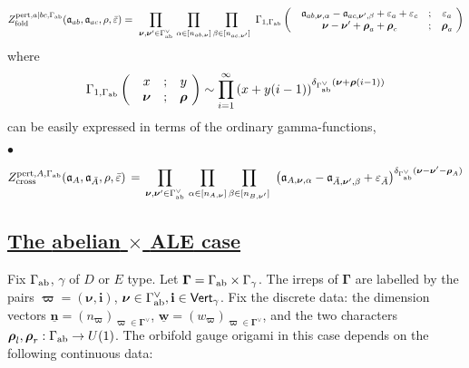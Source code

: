 \documentclass[12pt]{amsart}
\newcommand {\3}{\underline{\bf 3}}
\newcommand {\4}{\underline{\bf 4}}
\newcommand {\6}{\underline{\bf 6}}
\newcommand{\beq}{\begin{equation}}
\newcommand{\eeq}{\end{equation}}
\newcommand {\ib} {\mathbf{i}}
\newcommand {\bn}{\underline{\mathbf{n}}}
\newcommand {\bw} {\underline{\mathbf{w}}}
\newcommand {\bnu} {{\boldsymbol{\nu}}}
\newcommand {\bro} {{\boldsymbol{\rho}}}
\newcommand {\bom} {{\boldsymbol{\varpi}}}
\newcommand {\ac} {\mathfrak{a}}
\newcommand{\ve}{\varepsilon}
\newcommand{\Gammadi}{\boldsymbol{\Gamma}}
\newcommand{\Gamab}{{\Gamma}_{\rm ab}}
\newcommand{\Gamav}{{\Gamma}^{\vee}_{\rm ab}}
\newcommand{\Vg}{\mathsf{Vert}_{\gamma}}
\newcommand{\subsec}[1]{\subsection{\underline{\bf #1}}}
\begin{document}
\beq
Z^{{\rm pert}, a|bc,  \Gamab}_{\rm fold} ({\bf\ac}_{ab}, {\bf\ac}_{ac}, \rho, {\bar\ve} ) =  \ \prod_{{\bnu}, {\bnu}' \in {\Gamav}}\, \prod_{{\alpha} \in [n_{ab, \bnu}]}
\prod_{{\beta} \in [n_{ac, \bnu'}]}\
{\Gamma}_{1,\Gamab} \left(\begin{matrix} & {\ac}_{ab, \bnu, \alpha} - {\ac}_{ac, \bnu', \beta} + {\ve}_{a} + {\ve}_{c}  & ; & {\ve}_{a} \\
& {\bnu} - {\bnu}' + {\bro}_{a} + {\bro}_{c} & ;  & {\bro}_a  \\ \end{matrix} \ \right) 
\eeq
where
\beq
{\Gamma}_{1, \Gamab} \left(\begin{matrix} & x  & ; & y \\
& {\bnu}  & ;  & {\bro}  \\ \end{matrix} \ \right)
 \sim \prod_{i=1}^{\infty}
\left( x  + y(i-1) \right)^{{\delta}_{\Gamav}({\bnu} + {\bro}(i-1))} 
\eeq
can be easily expressed in terms of the ordinary gamma-functions, 

$\bullet$

\beq
Z^{{\rm pert}, A, \Gamab}_{\rm cross}
( {\bf\ac}_{A}, {\bf\ac}_{\bar A} ,\rho,  {\bar\ve}) \, = \, \prod_{{\bnu}, {\bnu}' \in {\Gamav}}\, \prod_{{\alpha} \in [n_{A,\bnu}]} \prod_{{\beta} \in [n_{B, \bnu'}]} \ \left( {\ac}_{A, \bnu, \alpha} - {\ac}_{{\bar A}, \bnu', \beta} +
 {\ve}_{\bar A} \right)^{{\delta}_{\Gamav}({\bnu}-{\bnu}' - {\bro}_{A})}  
 \label{eq:pertcross}
 \eeq




\subsec{The {\bf abelian} $\times$ {\bf ALE} case}

Fix $\Gamab$, $\gamma$ of $D$ or $E$ type. Let ${\Gammadi} = {\Gamab} \times {\Gamma}_{\gamma}$. The irreps of $\Gammadi$ are labelled by the pairs ${\bom} = ({\bnu}, {\ib})$, ${\bnu} \in {\Gamav}, {\ib} \in \Vg$. 
Fix the discrete data: the dimension vectors ${\bn} = (n_{\bom})_{{\bom} \in {\Gammadi}^{\vee}}$,   ${\bw} = ( w_{\bom})_{{\bom} \in {\Gammadi}^{\vee}}$, and the two characters ${\bro}_{l}, {\bro}_{r} : {\Gamab} \to U(1)$.
The orbifold gauge origami in this case depends on the following continuous data:
\end{document}
